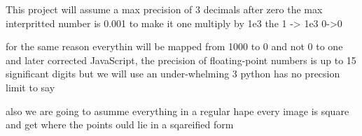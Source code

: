 This project will assume a max precision of 3 decimals after zero the max interpritted number is 0.001 to make it one multiply by 1e3 the 1 -> 1e3  0->0

for the same reason everythin will  be mapped from 1000 to 0 and not 0 to one and later corrected
 JavaScript, the precision of floating-point numbers is up to 15 significant digits but we will use an under-whelming 3
 python has no precsion limit  to say

 also we are going to asumme everything in a regular hape every image is square and get where the points ould lie in a sqareified form 
